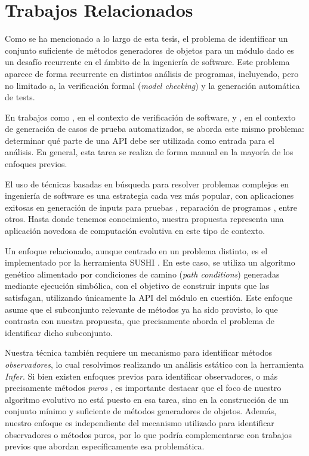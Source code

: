 \chapter[Trabajos Relacionados]{Trabajos Relacionados}
\label{cap:related-work}

Como se ha mencionado a lo largo de esta tesis, el problema de identificar un conjunto suficiente de métodos generadores de objetos 
para un módulo dado es un desafío recurrente en el ámbito de la ingeniería de software. Este problema
aparece de forma recurrente en distintos análisis de programas, incluyendo, pero no limitado a, la verificación formal 
(\emph{model checking}) y la generación automática de tests.

En trabajos como \cite{DBLP:conf/tacas/NoriRTT09,DBLP:conf/tacas/KhurshidPV03}, en el contexto de verificación 
de software, y \cite{Tillmann:2010,Tillmann:2008,paPacheco07,DBLP:conf/icse/BraioneDMP18}, en el contexto de generación de 
casos de prueba automatizados, se aborda este mismo problema: determinar qué parte de una API debe ser utilizada como entrada 
para el análisis. En general, esta tarea se realiza de forma manual en la mayoría de los enfoques previos.

El uso de técnicas basadas en búsqueda para resolver problemas complejos en ingeniería de software es una estrategia cada vez 
más popular, con aplicaciones exitosas en generación de inputs para pruebas \cite{Fraser:2011}, reparación de programas 
\cite{DBLP:journals/tse/GouesNFW12}, entre otros. Hasta donde tenemos conocimiento, nuestra propuesta representa 
una aplicación novedosa de computación evolutiva en este tipo de contexto.

Un enfoque relacionado, aunque centrado en un problema distinto, es el implementado por la herramienta \textsf{SUSHI} 
\cite{DBLP:conf/icse/BraioneDMP18}. En este caso, se utiliza un algoritmo genético alimentado por condiciones de camino 
(\emph{path conditions}) generadas mediante ejecución simbólica, con el objetivo de construir inputs que las satisfagan, 
utilizando únicamente la API del módulo en cuestión. Este enfoque asume que el subconjunto relevante de métodos ya 
ha sido provisto, lo que contrasta con nuestra propuesta, que precisamente aborda el problema de identificar dicho subconjunto.

Nuestra técnica también requiere un mecanismo para identificar métodos \emph{observadores}, lo cual resolvimos realizando un análisis estático con
la herramienta \emph{Infer}. Si bien existen enfoques previos para identificar observadores, o más precisamente métodos \emph{puros} \cite{Huang:2012,Salcianu:2005}, es importante destacar que el 
foco de nuestro algoritmo evolutivo no está puesto en esa tarea, sino en la construcción de un conjunto mínimo y suficiente 
de métodos generadores de objetos.
Además, nuestro enfoque es independiente del mecanismo utilizado para identificar observadores o métodos puros, por lo que podría 
complementarse con trabajos previos que abordan específicamente esa problemática.


